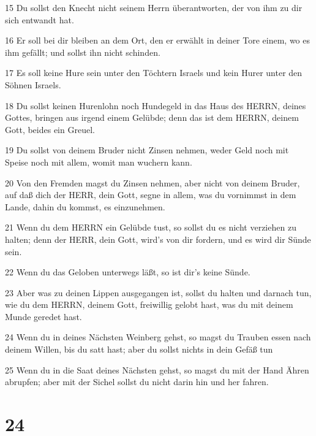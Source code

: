 \par 15 Du sollst den Knecht nicht seinem Herrn überantworten, der von ihm zu dir sich entwandt hat.
\par 16 Er soll bei dir bleiben an dem Ort, den er erwählt in deiner Tore einem, wo es ihm gefällt; und sollst ihn nicht schinden.
\par 17 Es soll keine Hure sein unter den Töchtern Israels und kein Hurer unter den Söhnen Israels.
\par 18 Du sollst keinen Hurenlohn noch Hundegeld in das Haus des HERRN, deines Gottes, bringen aus irgend einem Gelübde; denn das ist dem HERRN, deinem Gott, beides ein Greuel.
\par 19 Du sollst von deinem Bruder nicht Zinsen nehmen, weder Geld noch mit Speise noch mit allem, womit man wuchern kann.
\par 20 Von den Fremden magst du Zinsen nehmen, aber nicht von deinem Bruder, auf daß dich der HERR, dein Gott, segne in allem, was du vornimmst in dem Lande, dahin du kommst, es einzunehmen.
\par 21 Wenn du dem HERRN ein Gelübde tust, so sollst du es nicht verziehen zu halten; denn der HERR, dein Gott, wird's von dir fordern, und es wird dir Sünde sein.
\par 22 Wenn du das Geloben unterwegs läßt, so ist dir's keine Sünde.
\par 23 Aber was zu deinen Lippen ausgegangen ist, sollst du halten und darnach tun, wie du dem HERRN, deinem Gott, freiwillig gelobt hast, was du mit deinem Munde geredet hast.
\par 24 Wenn du in deines Nächsten Weinberg gehst, so magst du Trauben essen nach deinem Willen, bis du satt hast; aber du sollst nichts in dein Gefäß tun
\par 25 Wenn du in die Saat deines Nächsten gehst, so magst du mit der Hand Ähren abrupfen; aber mit der Sichel sollst du nicht darin hin und her fahren.

\chapter{24}

